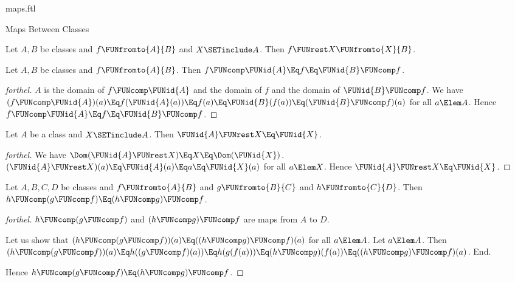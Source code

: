 \documentclass{stex}
\begin{document}
\begin{smodule}{maps.ftl}
\begin{sfragment}{Maps Between Classes}
  \begin{proposition}[forthel]
    Let $A, B$ be classes and $f \FUNfromto{A}{B}$ and $X \SETinclude A$.
    Then $f \FUNrest X \FUNfromto{X}{B}$.
  \end{proposition}

  \begin{proposition}[forthel]
    Let $A, B$ be classes and $f \FUNfromto{A}{B}$.
    Then $f \FUNcomp \FUNid{A} \Eq f \Eq \FUNid{B} \FUNcomp f$.
  \end{proposition}
  \begin{proof}[forthel]
    $A$ is the domain of $f \FUNcomp \FUNid{A}$ and the domain of $f$ and the domain of $\FUNid{B} \FUNcomp f$.
    We have $(f \FUNcomp \FUNid{A})(a)
      \Eq f(\FUNid{A}(a))
      \Eq f(a)
      \Eq \FUNid{B}(f(a))
      \Eq (\FUNid{B} \FUNcomp f)(a)$
    for all $a \Elem A$.
    Hence $f \FUNcomp \FUNid{A}
      \Eq f
      \Eq \FUNid{B} \FUNcomp f$.
  \end{proof}

  \begin{proposition}[forthel]
    Let $A$ be a class and $X \SETinclude A$.
    Then $\FUNid{A} \FUNrest X \Eq \FUNid{X}$.
  \end{proposition}
  \begin{proof}[forthel]
    We have $\Dom(\FUNid{A} \FUNrest X)
      \Eq X
      \Eq \Dom(\FUNid{X})$.
    $(\FUNid{A} \FUNrest X)(a)
      \Eq \FUNid{A}(a)
      \Eq a
      \Eq \FUNid{X}(a)$
    for all $a \Elem X$.
    Hence $\FUNid{A} \FUNrest X \Eq \FUNid{X}$.
  \end{proof}

  \begin{proposition}[forthel]
    Let $A, B, C, D$ be classes and $f \FUNfromto{A}{B}$ and $g \FUNfromto{B}{C}$ and $h \FUNfromto{C}{D}$.
    Then $h \FUNcomp (g \FUNcomp f) \Eq (h \FUNcomp g) \FUNcomp f$.
  \end{proposition}
  \begin{proof}[forthel]
    $h \FUNcomp (g \FUNcomp f)$ and $(h \FUNcomp g) \FUNcomp f$ are maps from $A$ to $D$.

    Let us show that $(h \FUNcomp (g \FUNcomp f))(a) \Eq ((h \FUNcomp g) \FUNcomp f)(a)$ for all $a \Elem A$.
      Let $a \Elem A$.
      Then $(h \FUNcomp (g \FUNcomp f))(a)
        \Eq h((g \FUNcomp f)(a))
        \Eq h(g(f(a)))
        \Eq (h \FUNcomp g)(f(a))
        \Eq ((h \FUNcomp g) \FUNcomp f)(a)$.
    End.

    Hence $h \FUNcomp (g \FUNcomp f) \Eq (h \FUNcomp g) \FUNcomp f$.
  \end{proof}
\end{sfragment}


\end{smodule}
\end{document}
